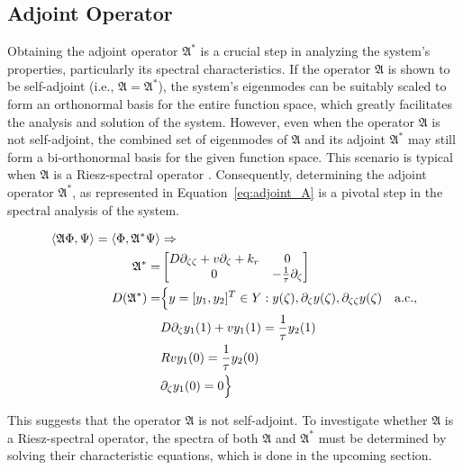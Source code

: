 \subsection{Adjoint Operator}

Obtaining the adjoint operator $\mathfrak{A}^*$ is a crucial step in analyzing the system's properties, particularly its spectral characteristics. If the operator $\mathfrak{A}$ is shown to be self-adjoint (i.e., $\mathfrak{A} = \mathfrak{A}^*$), the system's eigenmodes can be suitably scaled to form an orthonormal basis for the entire function space, which greatly facilitates the analysis and solution of the system. However, even when the operator $\mathfrak{A}$ is not self-adjoint, the combined set of eigenmodes of $\mathfrak{A}$ and its adjoint $\mathfrak{A}^*$ may still form a bi-orthonormal basis for the given function space. This scenario is typical when $\mathfrak{A}$ is a Riesz-spectral operator \autocite{curtainbook}. Consequently, determining the adjoint operator $\mathfrak{A}^*$, as represented in Equation~\ref{eq:adjoint_A} is a pivotal step in the spectral analysis of the system.

\begin{equation} \label{eq:adjoint_A}
    \begin{aligned}
        \langle \mathfrak{A} \Phi, \Psi\rangle  = \langle \Phi, {\mathfrak{A}}^{*} \Psi\rangle  &\Rightarrow \\
        {\mathfrak{A}}^{*} =&
        \begin{bmatrix}
            D \partial_{\zeta \zeta} + v \partial_\zeta +k_r & 0\\
            0 & -\frac{1}{\tau} \partial_\zeta
        \end{bmatrix}\\
        D(\mathfrak{A}^*) =& \Bigl\{ y = [y_1, y_2]^T \in Y:
        y(\zeta), \partial_\zeta y(\zeta), \partial_{\zeta \zeta} y(\zeta) \quad \mathrm{a.c.},\\
        &D \partial_\zeta y_1(1) + v y_1(1) = \frac{1}{\tau} y_2(1) \\
        &R v y_1(0) = \frac{1}{\tau} y_2(0) \\
        &\partial_\zeta y_1(0) = 0 \Bigr\}
    \end{aligned}
\end{equation}

This suggests that the operator $\mathfrak{A}$ is not self-adjoint. To investigate whether $\mathfrak{A}$ is a Riesz-spectral operator, the spectra of both $\mathfrak{A}$ and $\mathfrak{A}^*$ must be determined by solving their characteristic equations, which is done in the upcoming section.

